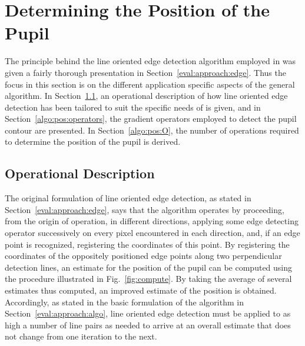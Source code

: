 
\section{Determining the Position of the Pupil}
\label{algo:pos}

The principle behind the line oriented edge detection algorithm
employed in {\octopus} was given a fairly thorough presentation in
Section~\ref{eval:approach:edge}.  Thus the focus in this section is
on the different application specific aspects of the general
algorithm.  In Section~\ref{algo:pos:operation}, an operational
description of how line oriented edge detection has been tailored to
suit the specific needs of {\octopus} is given, and in
Section~\ref{algo:pos:operators}, the gradient operators employed to
detect the pupil contour are presented.  In Section~\ref{algo:pos:O},
the number of operations required to determine the position of the
pupil is derived.

\subsection{Operational Description}
\label{algo:pos:operation}

The original formulation of line oriented edge detection, as stated in
Section~\ref{eval:approach:edge}, says that the algorithm operates by
proceeding, from the origin of operation, in different directions,
applying some edge detecting operator successively on every pixel
encountered in each direction, and, if an edge point is recognized,
registering the coordinates of this point.  By registering the
coordinates of the oppositely positioned edge points along two
perpendicular detection lines, an estimate for the position of the
pupil can be computed using the procedure illustrated in
Fig.~\ref{fig:compute}.  By taking the average of several estimates
thus computed, an improved estimate of the position is obtained.
Accordingly, as stated in the basic formulation of the {\octopus}
algorithm in Section~\ref{eval:approach:algo}, line oriented edge
detection must be applied to as high a number of line pairs as needed
to arrive at an overall estimate that does not change from one
iteration to the next.

